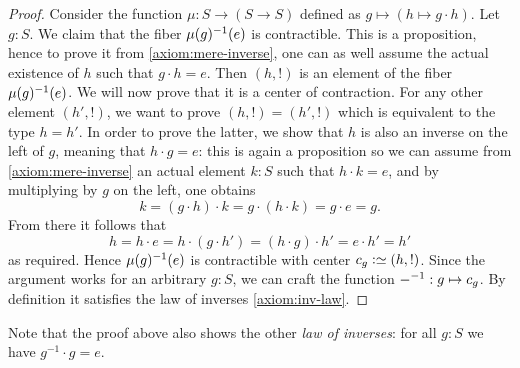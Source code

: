 \begin{proof}
  Consider the function $\mu: S \to (S \to S)$ defined as
  $g\mapsto (h \mapsto g\cdot h)$. Let $g:S$. We claim that the fiber
  $\mu(g)^{-1}(e)$ is contractible. This is a proposition, hence to
  prove it from \ref{axiom:mere-inverse}, one can as well assume the
  actual existence of $h$ such that $g\cdot h = e$. Then $(h,!)$ is an
  element of the fiber $\mu(g)^{-1}(e)$. We will now prove that it is
  a center of contraction. For any other element $(h',!)$, we want to
  prove $(h,!) = (h',!)$ which is equivalent to the type $h=h'$. In
  order to prove the latter, we show that $h$ is also an inverse on
  the left of $g$, meaning that $h\cdot g=e$: this is again a
  proposition so we can assume from \ref{axiom:mere-inverse} an
  actual element $k:S$ such that $h\cdot k = e$, and by multiplying by
  $g$ on the left, one obtains
  \begin{displaymath}
    k = (g\cdot h)\cdot k = g\cdot (h\cdot k) = g\cdot e = g.
  \end{displaymath}
  From there it follows that
  \begin{displaymath}
    h = h \cdot e = h \cdot (g\cdot h') = (h \cdot g) \cdot h' = e\cdot
    h' = h'
  \end{displaymath}
  as required. Hence $\mu(g)^{-1}(e)$ is contractible with center
  $c_g \defequi (h,!)$. Since the argument works for an arbitrary $g:S$,
  we can craft the function ${-}^{-1} : g \mapsto c_g$. By
  definition it satisfies the law of inverses \ref{axiom:inv-law}.
\end{proof}
Note that the proof above also shows the other \emph{law of inverses}:
for all $g:S$ we have $g^{-1}\cdot g=e$.

